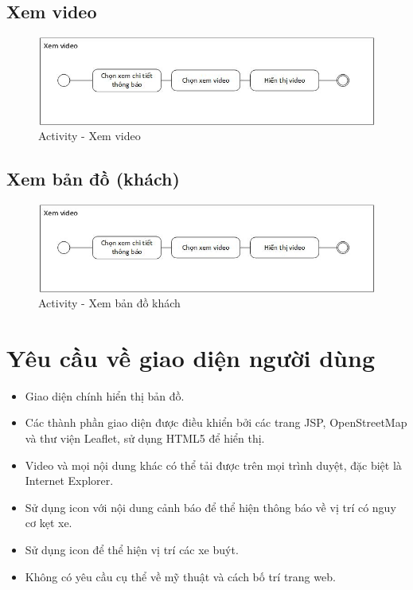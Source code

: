 	\subsection{Xem video}
		\begin{figure}[H]
			\centering
			\includegraphics[scale=.75]{Graphics/activity-viewvideo}
			\caption{Activity - Xem video}
		\end{figure}
		
	
	\subsection{Xem bản đồ (khách)}
		\begin{figure}[H]
			\centering
			\includegraphics[scale=.75]{Graphics/activity-viewvideo}
			\caption{Activity - Xem bản đồ khách}
		\end{figure}
	
\section{Yêu cầu về giao diện người dùng}
\begin{itemize}
	\item Giao diện chính hiển thị bản đồ.
	\item Các thành phần giao diện được điều khiển bởi các trang JSP, OpenStreetMap và thư viện Leaflet, sử dụng HTML5 để hiển thị.
	\item Video và mọi nội dung khác có thể tải được trên mọi trình duyệt, đặc biệt là Internet Explorer.
	\item Sử dụng icon với nội dung cảnh báo để thể hiện thông báo về vị trí có nguy cơ kẹt xe.
	\item Sử dụng icon để thể hiện vị trí các xe buýt.
	\item Không có yêu cầu cụ thể về mỹ thuật và cách bố trí trang web.
\end{itemize}

